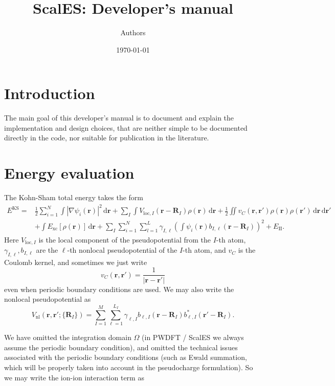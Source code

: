 \documentclass{article}
\newcommand{\bvec}[1]{\mathbf{#1}}
\newcommand{\vr}{\bvec{r}}
\newcommand{\vR}{\bvec{R}}
\newcommand{\ud}{\,\mathrm{d}}
\newcommand{\II}{\mathrm{II}}
\theoremstyle{plain}
\theoremstyle{remark}
\theoremstyle{plain}
\theoremstyle{plain}
\theoremstyle{plain}
\begin{document}
\title{ScalES: Developer's manual}
\author{Authors}
\date{\today}
\maketitle


\section{Introduction}

The main goal of this developer's manual is to document and explain the implementation and design choices, that are neither simple to be documented directly in the code, nor suitable for publication in the literature.  

\section{Energy evaluation}

The Kohn-Sham total energy takes the form
\begin{equation}
    \begin{aligned}
    E^{\text{KS}}=& \frac{1}{2} \sum_{i=1}^{N} \int \left|\nabla \psi_{i}(\vr)\right|^{2} \ud \vr +\sum_{I} \int V_{\text{loc}, I}\left(\vr-\vR_{I}\right) \rho(\vr) \ud \vr +\frac{1}{2} \iint v_C(\vr,\vr')\rho(\vr) \rho(\vr') \ud \vr \ud \vr'\\
    &+\int E_{\text{xc}}[\rho(\vr)]\ud \vr+\sum_{I} \sum_{i=1}^{N} \sum_{l=1}^{L} \gamma_{I, \ell}\left(\int \psi_{i}(\vr) b_{I, \ell}\left(\vr-\vR_{I}\right)\right)^{2} +E_{\II}. 
    \end{aligned}
\label{eqn:KSEnergy}
\end{equation}
Here $V_{\text{loc},I}$ is the local component of the pseudopotential from the $I$-th atom, $\gamma_{I,\ell},b_{I,\ell}$ are the $\ell$-th nonlocal pseudopotential of the $I$-th atom, and $v_C$ is the Coulomb kernel, and sometimes we just write
\begin{equation}
v_C(\vr,\vr')=\frac{1}{|\vr-\vr'|}
\label{eqn:vC}
\end{equation}
even when periodic boundary conditions are used. 
We may also write the nonlocal pseudopotential as
\begin{equation}
V_{\text{nl}}(\vr,\vr';\{\vR_{I}\})=\sum_{I=1}^{M}\sum_{\ell=1}^{L_{I}} \gamma_{\ell,I}
  b_{\ell,I}(\vr-\vR_{I}) b_{\ell,I}^{*}(\vr'-\vR_{I}).
\label{eqn:nonlocal}
\end{equation}

We have omitted the integration domain $\Omega$ (in PWDFT / ScalES we always assume the periodic boundary condition), and omitted the technical issues associated with the periodic boundary conditions (such as Ewald summation, which will be properly taken into account in the pseudocharge formulation). So we may write the ion-ion interaction term as
\end{document}
